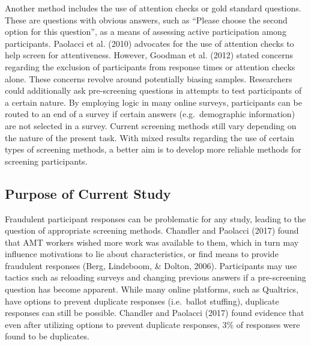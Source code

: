\documentclass[english,man]{apa6}
\theoremstyle{definition}
\theoremstyle{definition}
\theoremstyle{definition}
\theoremstyle{remark}
\begin{document}
Another method includes the use of attention checks or gold standard
questions. These are questions with obvious answers, such as
\enquote{Please choose the second option for this question}, as a means
of assessing active participation among participants. Paolacci et al.
(2010) advocates for the use of attention checks to help screen for
attentiveness. However, Goodman et al. (2012) stated concerns regarding
the exclusion of participants from response times or attention checks
alone. These concerns revolve around potentially biasing samples.
Researchers could additionally ask pre-screening questions in attempts
to test participants of a certain nature. By employing logic in many
online surveys, participants can be routed to an end of a survey if
certain answers (e.g.~demographic information) are not selected in a
survey. Current screening methods still vary depending on the nature of
the present task. With mixed results regarding the use of certain types
of screening methods, a better aim is to develop more reliable methods
for screening participants.

\subsection{Purpose of Current Study}\label{purpose-of-current-study}

Fraudulent participant responses can be problematic for any study,
leading to the question of appropriate screening methods. Chandler and
Paolacci (2017) found that AMT workers wished more work was available to
them, which in turn may influence motivations to lie about
characteristics, or find means to provide fraudulent responses (Berg,
Lindeboom, \& Dolton, 2006). Participants may use tactics such as
reloading surveys and changing previous answers if a pre-screening
question has become apparent. While many online platforms, such as
Qualtrics, have options to prevent duplicate responses (i.e.~ballot
stuffing), duplicate responses can still be possible. Chandler and
Paolacci (2017) found evidence that even after utilizing options to
prevent duplicate responses, 3\% of responses were found to be
duplicates.
\end{document}

